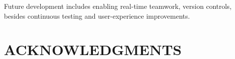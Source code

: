\documentclass{scsSimAUDPaperFormat}
\begin{document}
Future development includes enabling real-time teamwork, version controls, besides continuous testing and user-experience improvements. 

\section*{ACKNOWLEDGMENTS}






\end{document}
